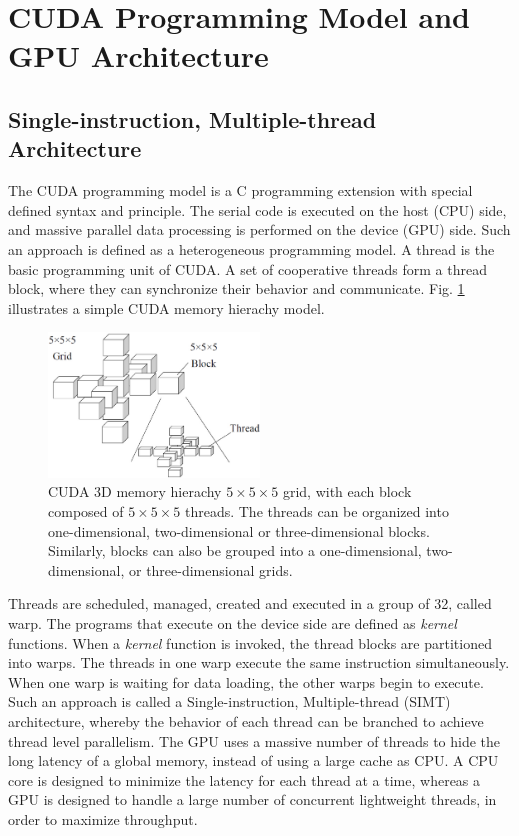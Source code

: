 \documentclass[letterpaper, 10pt, conference, twoside]{ieeeconf}
\begin{document}
\section{CUDA Programming Model and GPU Architecture} \label{programming model} 
\subsection{Single-instruction, Multiple-thread Architecture}
The CUDA programming model is a C programming extension with special defined syntax and principle. The serial code is executed on the host (CPU) side, and massive parallel data processing is performed on the device (GPU) side. Such an approach is defined as a heterogeneous programming model. A thread is the basic programming unit of CUDA. A set of cooperative threads form a thread block, where they can synchronize their behavior and communicate. Fig. \ref{figure1} illustrates a simple CUDA memory hierachy model.
\begin{figure}[htb]
\centering
\includegraphics*[width=0.5\textwidth]{CUDA_programming_hierachy.eps}
\caption{ CUDA 3D memory hierachy $5\times 5\times 5$ grid, with each block composed of $5\times 5\times 5$ threads.
The threads can be organized into one-dimensional, two-dimensional or three-dimensional blocks. Similarly, blocks can also be grouped into a one-dimensional, two-dimensional, or three-dimensional grids.
}
\label{figure1}
\end{figure} 

Threads are scheduled, managed, created and executed in a group of 32, called warp. The programs that execute on the device side are defined as \textit{kernel} functions. When a \textit{kernel} function is invoked, the thread blocks are partitioned into warps. The threads in one warp execute the same instruction simultaneously. When one warp is waiting for data loading, the other warps begin to execute. Such an approach is called a Single-instruction, Multiple-thread (SIMT) architecture, whereby the behavior of each thread can be branched to achieve thread level parallelism. The GPU uses a massive number of threads to hide the long latency of a global memory, instead of using a large cache as CPU. A CPU core is designed to minimize the latency for each thread at a time, whereas a GPU is designed to handle a large number of concurrent lightweight threads, in order to maximize throughput.
\end{document}
